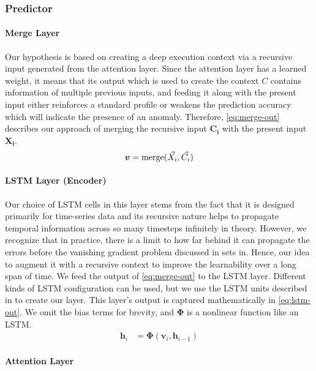 \subsubsection{Predictor}
\label{subsec:predictor}
\paragraph{Merge Layer}
Our hypothesis is based on creating a deep execution context via a recursive 
input generated from the attention layer. Since the attention layer has a 
learned weight, it means that its output which is used to create the context $ 
C $ contains information of multiple previous inputs, and feeding it along with 
the present input either reinforces a standard profile or weakens the 
prediction accuracy which will indicate the presence of an anomaly. Therefore, 
\eqref{eq:merge-out} describes our approach of merging the recursive input $ 
\bm{C_i} $ with the present input $ \bm{X_i} $.
\begin{equation}
\bm{v} = \text{merge}(\vec{X_i},\vec{C_i}) \\
\label{eq:merge-out}
\end{equation}

\paragraph{LSTM Layer (Encoder)}
\label{subsec:encoder}
Our choice of LSTM cells in this layer stems from the fact that it is designed 
primarily for time-series data and its recursive nature helps to propagate 
temporal information across so many timesteps infinitely in theory. However, we 
recognize that in practice, there is a limit to how far behind it can propagate 
the errors before the vanishing gradient problem discussed in 
\cite{werbos1990backpropagation} sets in. Hence, our idea to augment it with a 
recursive context to improve the learnability over a long span of time. We 
feed the output of \eqref{eq:merge-out} to the LSTM layer. Different kinds of 
LSTM configuration can be used, but we use the LSTM units described in 
\cite{hochreiter1997long} to create our layer. This layer's output is captured 
mathematically in \eqref{eq:lstm-out}. We omit the bias terms for brevity, and 
$ \bm{\Phi} $ is a nonlinear function like an LSTM. 
\begin{align}
\bm{h}_{i} &= \bm{\Phi}\left(\bm{v}_i,\bm{h}_{i-1} \right)
\label{eq:lstm-out}
\end{align}

\paragraph{Attention Layer}
\label{subsec:attention}

